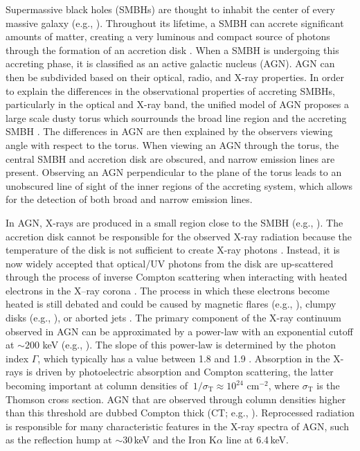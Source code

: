 \documentclass[fleqn,usenatbib]{mnras}
\begin{document}
    Supermassive black holes (SMBHs) are thought to inhabit the center of every massive galaxy (e.g., \citealp{1998AJ....115.2285M}). Throughout its lifetime, a SMBH can accrete significant amounts of matter, creating a very luminous and compact source of photons through the formation of an accretion disk \citep{1973A&A....24..337S}. When a SMBH is undergoing this accreting phase, it is classified as an active galactic nucleus (AGN). AGN can then be subdivided based on their optical, radio, and X-ray properties. In order to explain the differences in the observational properties of accreting SMBHs, particularly in the optical and X-ray band, the unified model of AGN proposes a large scale dusty torus which sourrounds the broad line region and the accreting SMBH \citep{1993ARA&A..31..473A,1995PASP..107..803U, 2015ARA&A..53..365N, 2017NatAs...1..679R}. The differences in AGN are then explained by the observers viewing angle with respect to the torus. When viewing an AGN through the torus, the central SMBH and accretion disk are obscured, and narrow emission lines are present. Observing an AGN perpendicular to the plane of the torus leads to an unobscured line of sight of the inner regions of the accreting system, which allows for the detection of both broad and narrow emission lines. 

    In AGN, X-rays are produced in a small region close to the SMBH (e.g., \citealp{2009ApJ...693..174C, 2014A&ARv..22...72U}). The accretion disk cannot be responsible for the observed X-ray radiation because the temperature of the disk is not sufficient to create X-ray photons \citep{1973A&A....24..337S}. Instead, it is now widely accepted that optical/UV photons from the disk are up-scattered through the process of inverse Compton scattering when interacting with heated electrons in the X--ray corona \citep{1991ApJ...380L..51H, 1993ApJ...413..507H}. The process in which these electrons become heated is still debated and could be caused by magnetic flares (e.g., \citealp{1994ApJ...432L..95H,2000MNRAS.318L..15M}), clumpy disks (e.g., \citealp{1988MNRAS.233..475G}), or aborted jets \citep{1997A&A...326...87H}. The primary component of the X-ray continuum observed in AGN can be approximated by a power-law with an exponential cutoff at $\sim 200$ keV (e.g., \citealp{10.1093/mnras/sty1879}). The slope of this power-law is determined by the photon index $\Gamma$, which typically has a value between 1.8 and 1.9 \citep{Nandra7469,10.1111/j.1365-2966.2011.18207.x, 2017ApJS..233...17R}. Absorption in the X-rays is driven by photoelectric absorption and Compton scattering, the latter becoming important at column densities of $~1/\sigma_{\mathrm{T}}\approx 10^{24}$ cm$^{-2}$, where $\sigma_{\text{T}}$ is the Thomson cross section. AGN that are observed through column densities higher than this threshold are dubbed Compton thick (CT; e.g., \citealp{10.1046/j.1365-8711.2000.03721.x,10.1111/j.1365-2966.2010.17902.x,10.1111/j.1365-2966.2012.20908.x,2015ApJ...815L..13R, 10.1093/mnras/stw1764, Hikitani_2018}). Reprocessed radiation is responsible for many characteristic features in the X-ray spectra of AGN, such as the reflection hump at $\sim 30$\,keV and the Iron K$\alpha$ line at 6.4\,keV. 
    
\end{document}
